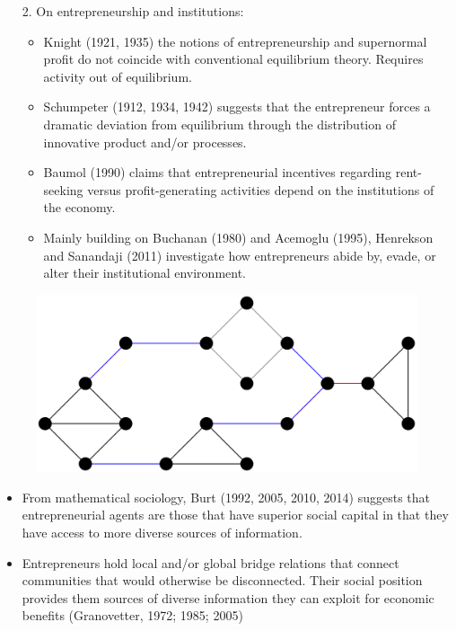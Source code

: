 \documentclass[10pt]{beamer}
\begin{document}
\begin{frame}
\begin{itemize}
\item[2.] On entrepreneurship and institutions:
\begin{itemize}
\medskip
\item Knight (1921, 1935) the notions of entrepreneurship and supernormal profit do not coincide with conventional equilibrium theory. Requires activity out of equilibrium.
\medskip
\item Schumpeter (1912, 1934, 1942) suggests that the entrepreneur forces a dramatic deviation from equilibrium through the distribution of innovative product and/or processes.
\medskip
\item Baumol (1990) claims that entrepreneurial incentives regarding rent-seeking versus profit-generating activities depend on the institutions of the economy.
\medskip
\item Mainly building on Buchanan (1980) and Acemoglu (1995), Henrekson and Sanandaji (2011) investigate how entrepreneurs abide by, evade, or alter their institutional environment.
\end{itemize}
\end{itemize}
\end{frame}

\begin{frame}
\begin{figure}[h]
\centering
\includegraphics[scale=0.35]{../Images/networkbridge.png}
\end{figure}
\begin{itemize}
\item From mathematical sociology, Burt (1992, 2005, 2010, 2014) suggests that entrepreneurial agents are those that have superior social capital in that they have access to more diverse sources of information.
\medskip
\item Entrepreneurs hold local and/or global bridge relations that connect communities that would otherwise be disconnected. Their social position provides them sources of diverse information they can exploit for economic benefits (Granovetter, 1972; 1985; 2005)
\end{itemize}
\end{frame}
\end{document}
